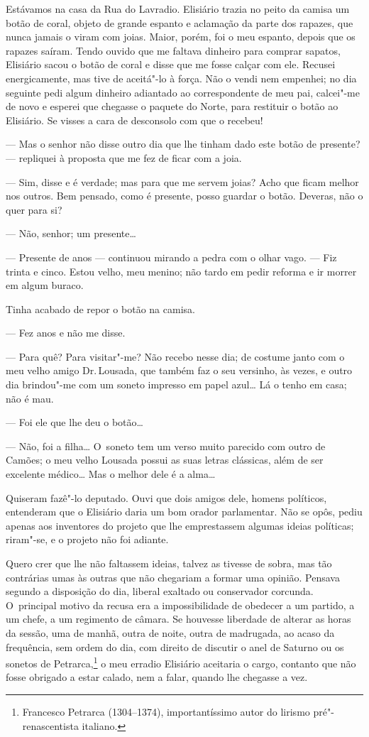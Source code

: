 \begin{linenumbers}
Estávamos na casa da Rua do Lavradio. Elisiário trazia no peito da
camisa um botão de coral, objeto de grande espanto e aclamação da parte
dos rapazes, que nunca jamais o viram com joias. Maior, porém, foi o meu
espanto, depois que os rapazes saíram. Tendo ouvido que me faltava
dinheiro para comprar sapatos, Elisiário sacou o botão de coral e disse
que me fosse calçar com ele. Recusei energicamente, mas tive de
aceitá"-lo à força. Não o vendi nem empenhei; no dia seguinte pedi algum
dinheiro adiantado ao correspondente de meu pai, calcei"-me de novo e
esperei que chegasse o paquete do Norte, para restituir o botão ao
Elisiário. Se visses a cara de desconsolo com que o recebeu!

--- Mas o senhor não disse outro dia que lhe tinham dado este botão de
presente? --- repliquei à proposta que me fez de ficar com a joia.

--- Sim, disse e é verdade; mas para que me servem joias? Acho que ficam
melhor nos outros. Bem pensado, como é presente, posso guardar o botão.
Deveras, não o quer para si?

--- Não, senhor; um presente\ldots{}

--- Presente de anos --- continuou mirando a pedra com o olhar vago. ---
Fiz trinta e cinco. Estou velho, meu menino; não tardo em pedir reforma
e ir morrer em algum buraco.

Tinha acabado de repor o botão na camisa.

--- Fez anos e não me disse.

--- Para quê? Para visitar"-me? Não recebo nesse dia; de costume janto com
o meu velho amigo Dr.\,Lousada, que também faz o seu versinho, às vezes,
e outro dia brindou"-me com um soneto impresso em papel azul\ldots{} Lá o
tenho em casa; não é mau.

--- Foi ele que lhe deu o botão\ldots{}

--- Não, foi a filha\ldots{} O~soneto tem um verso muito parecido com outro de
Camões; o meu velho Lousada possui as suas letras clássicas, além de ser
excelente médico\ldots{} Mas o melhor dele é a alma\ldots{}

Quiseram fazê"-lo deputado. Ouvi que dois amigos dele, homens políticos,
entenderam que o Elisiário daria um bom orador parlamentar. Não se opôs,
pediu apenas aos inventores do projeto que lhe emprestassem algumas
ideias políticas; riram"-se, e o projeto não foi adiante.

Quero crer que lhe não faltassem ideias, talvez as tivesse de sobra, mas
tão contrárias umas às outras que não chegariam a formar uma opinião.
Pensava segundo a disposição do dia, liberal exaltado ou conservador
corcunda. O~principal motivo da recusa era a impossibilidade de obedecer
a um partido, a um chefe, a um regimento de câmara. Se houvesse
liberdade de alterar as horas da sessão, uma de manhã, outra de noite,
outra de madrugada, ao acaso da frequência, sem ordem do dia, com
direito de discutir o anel de Saturno ou os sonetos de
Petrarca,\footnote{Francesco Petrarca (1304--1374), importantíssimo autor
  do lirismo pré"-renascentista italiano.} o meu erradio Elisiário
aceitaria o cargo, contanto que não fosse obrigado a estar calado, nem a
falar, quando lhe chegasse a vez.


\end{linenumbers}
